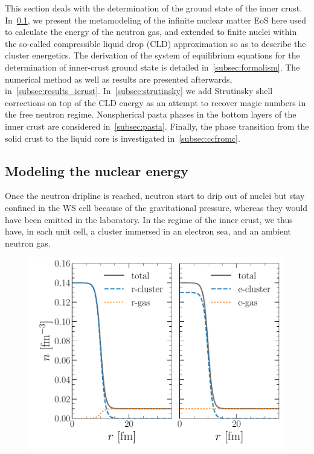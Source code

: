This section deals with the determination of the ground state of the inner
crust. In~\ref{subsec:nucenergy}, we present the metamodeling of the
infinite nuclear matter EoS here used to calculate the energy of the neutron 
gas, and extended to finite nuclei within the so-called compressible liquid 
drop (CLD) approximation so as to describe the cluster energetics. The derivation of the 
system of equilibrium equations for the determination of inner-crust ground state 
is detailed in~\ref{subsec:formalism}. The numerical
method as well as results are presented afterwards, 
in~\ref{subsec:results_icrust}. In~\ref{subsec:strutinsky} we add Strutinsky
shell corrections on top of the CLD energy as an attempt to recover magic
numbers in the free neutron regime. Nonspherical pasta phases in the bottom 
layers of the inner crust are considered in~\ref{subsec:pasta}. Finally, the
phase transition from the solid crust to the liquid core is investigated 
in~\ref{subsec:ccfromc}.

\subsection{Modeling the nuclear energy}\label{subsec:nucenergy}

Once the neutron dripline is reached, neutron start to drip out of nuclei but
stay confined in the WS cell because of the gravitational pressure,
whereas they would have been emitted in the laboratory. In the regime of the inner
crust, we thus have, in each unit cell, a cluster immersed in an electron sea, 
and an ambient neutron gas.

\begin{figure}[!t]
\begin{center}
  \includegraphics[width=0.9\linewidth]{figures/clustering.pdf}
\end{center}
\caption[]{}\label{fig:clustering}
\end{figure}

